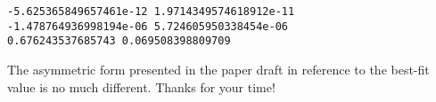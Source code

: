 \documentclass[11pt]{article}
\begin{document}
    \begin{Verbatim}[commandchars=\\\{\}]
-5.625365849657461e-12 1.9714349574618912e-11
-1.478764936998194e-06 5.724605950338454e-06
0.676243537685743 0.069508398809709

    \end{Verbatim}

    The asymmetric form presented in the paper draft in reference to the
best-fit value is no much different. Thanks for your time!


    
    
    
    
\end{document}
